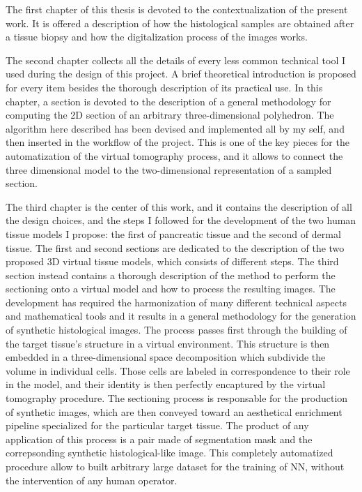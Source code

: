 The first chapter of this thesis is devoted to the contextualization of the present work. It is offered a description of how the histological samples are obtained after a tissue biopsy and how the digitalization process of the images works.

The second chapter collects all the details of every less common technical tool I used during the design of this project. A brief theoretical introduction is proposed for every item besides the thorough description of its practical use. In this chapter, a section is devoted to the description of a general methodology for computing the 2D section of an arbitrary three-dimensional polyhedron. The algorithm here described has been devised and implemented all by my self, and then inserted in the workflow of the project. This is one of the key pieces for the automatization of the virtual tomography process, and it allows to connect the three dimensional model to the two-dimensional representation of a sampled section.

The third chapter is the center of this work, and it contains the description of all the design choices, and the steps I followed for the development of the two human tissue models I propose: the first of pancreatic tissue and the second of dermal tissue. The first and second sections are dedicated to the description of the two proposed 3D virtual tissue models, which consists of different steps. The third section instead contains a thorough description of the method to perform the sectioning onto a virtual model and how to process the resulting images. The development has required the harmonization of many different technical aspects and mathematical tools and it results in a general methodology for the generation of synthetic histological images. The process passes first through the building of the target tissue's structure in a virtual environment. This structure is then embedded in a three-dimensional space decomposition which subdivide the volume in individual cells. Those cells are labeled in correspondence to their role in the model, and their identity is then perfectly encaptured by the virtual tomography
procedure. The sectioning process is responsable for the production of synthetic images, which are then conveyed toward an aesthetical enrichment pipeline specialized for the particular target tissue. The product of any application of this process is a pair made of segmentation mask and the correpsonding synthetic histological-like image. This completely automatized procedure allow to built arbitrary large dataset for the training of NN, without the intervention of any human operator.

